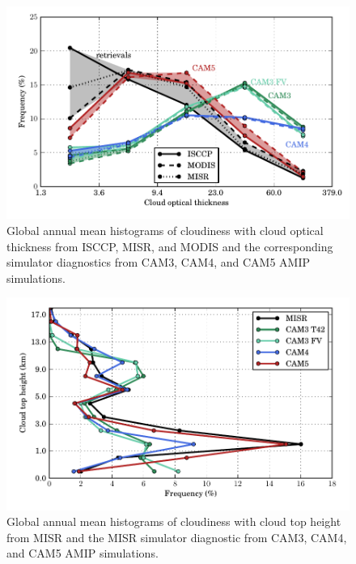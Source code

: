 \begin{figure}
    \centering
    \includegraphics{../graphics/tau_camamip.pdf}
    \caption{Global annual mean histograms of cloudiness with cloud optical thickness from ISCCP, MISR, and MODIS and the corresponding simulator diagnostics from CAM3, CAM4, and CAM5 AMIP simulations.}
    \label{tau_camamip}
\end{figure}
\begin{figure}
    \centering
    \includegraphics{../graphics/cth_camamip.pdf}
    \caption{Global annual mean histograms of cloudiness with cloud top height from MISR and the MISR simulator diagnostic from CAM3, CAM4, and CAM5 AMIP simulations.}
    \label{cth_camamip}
\end{figure}


